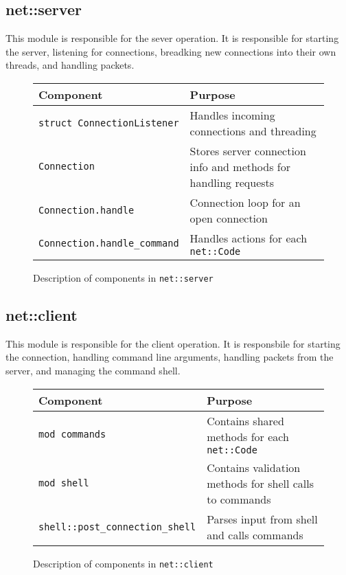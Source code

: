 \documentclass{article}
\begin{document}
\subsection{net::server}
This module is responsible for the sever operation. It is responsible for starting the server, listening for connections, breadking new connections into their own threads, and handling packets.
\begin{figure}
	\begin{tabular}{|l|l|}
		\hline
		Component & Purpose\\\hline
		\verb|struct ConnectionListener| & Handles incoming connections and threading\\
		\verb|Connection| & Stores server connection info and methods for handling requests\\
		\verb|Connection.handle| & Connection loop for an open connection\\
		\verb|Connection.handle_command| & Handles actions for each \verb|net::Code|\\
		\hline
	\end{tabular}
	\caption{Description of components in \texttt{net::server}}
\end{figure}

\subsection{net::client}
This module is responsible for the client operation. It is responsbile for starting the connection, handling command line arguments, handling packets from the server, and managing the command shell.

\begin{figure}
	\begin{tabular}{|l|l|}
		\hline
		Component & Purpose\\\hline
		\verb|mod commands| & Contains shared methods for each \verb|net::Code|\\
		\verb|mod shell| & Contains validation methods for shell calls to commands\\
		\verb|shell::post_connection_shell| & Parses input from shell and calls commands\\
		\hline
	\end{tabular}
	\caption{Description of components in \texttt{net::client}}
\end{figure}
\end{document}
